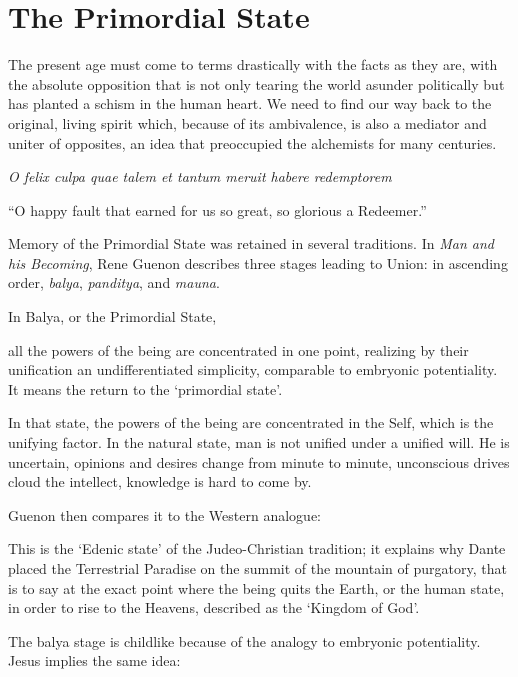 \section{The Primordial State}

\begin{quotex}
The present age must come to terms drastically with the facts as they are, with the absolute opposition that is not only tearing the world asunder politically but has planted a schism in the human heart. We need to find our way back to the original, living spirit which, because of its ambivalence, is also a mediator and uniter of opposites, an idea that preoccupied the alchemists for many centuries. 

\emph{O felix culpa quae talem et tantum meruit habere redemptorem}

“O happy fault that earned for us so great, so glorious a Redeemer.” 

\end{quotex}
Memory of the Primordial State was retained in several traditions. In \emph{Man and his Becoming}, Rene Guenon describes three stages leading to Union: in ascending order, \emph{balya}, \emph{panditya}, and \emph{mauna}.

In Balya, or the Primordial State,

\begin{quotex}
all the powers of the being are concentrated in one point, realizing by their unification an undifferentiated simplicity, comparable to embryonic potentiality. It means the return to the `primordial state'. 

\end{quotex}
In that state, the powers of the being are concentrated in the Self, which is the unifying factor. In the natural state, man is not unified under a unified will. He is uncertain, opinions and desires change from minute to minute, unconscious drives cloud the intellect, knowledge is hard to come by.

Guenon then compares it to the Western analogue:

\begin{quotex}
This is the `Edenic state' of the Judeo-Christian tradition; it explains why Dante placed the Terrestrial Paradise on the summit of the mountain of purgatory, that is to say at the exact point where the being quits the Earth, or the human state, in order to rise to the Heavens, described as the `Kingdom of God'. 

\end{quotex}
The balya stage is childlike because of the analogy to embryonic potentiality. Jesus implies the same idea:

